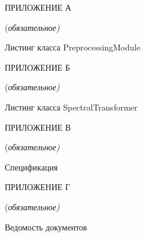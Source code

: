 \newpage
\centerline{ПРИЛОЖЕНИЕ А}
\centerline{(\it{обязательное})}
\vspace{\baselineskip}
\centerline{Листинг класса PreprocessingModule}
\label{sec:appendix_a}
\newpage
\centerline{ПРИЛОЖЕНИЕ Б}
\centerline{(\it{обязательное})}
\vspace{\baselineskip}
\centerline{Листинг класса SpectralTransformer}
\label{sec:appendix_b}
\newpage
\centerline{ПРИЛОЖЕНИЕ В}
\centerline{(\it{обязательное})}
\vspace{\baselineskip}
\centerline{Спецификация}
\label{sec:appendix_c}
\newpage
\centerline{ПРИЛОЖЕНИЕ Г}
\centerline{(\it{обязательное})}
\vspace{\baselineskip}
\centerline{Ведомость документов}
\label{sec:appendix_d}

